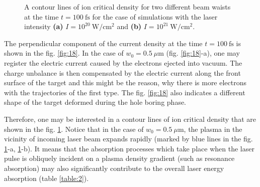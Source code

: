 \begin{figure}[h!]
	\centering
	\hspace{1mm}
	\caption{A contour lines of ion critical density for two different beam waists at the time $ t = 100 \ \mathrm{fs} $ for the case of simulations with the laser intensity \textbf{(a)} $ I = 10^{20} \ \mathrm{W/cm^2} $ and \textbf{(b)} $ I = 10^{21} \ \mathrm{W/cm^2} $.}
	\label{fig:15}
\end{figure}

The perpendicular component of the current density at the time $ t = 100 \ \mathrm{fs} $ is shown in the fig. \ref{fig:18}. In the case of $ w_0 = 0.5 \ \mu\mathrm{m} $ (fig. \ref{fig:18}-a), one may register the electric current caused by the electrons ejected into vacuum. The charge unbalance is then compensated by the electric current along the front surface of the target and this might be the reason, why there is more electrons with the trajectories of the first type. The fig. \ref{fig:18} also indicates a different shape of the target deformed during the hole boring phase.

Therefore, one may be interested in a contour lines of ion critical density that are shown in the fig. \ref{fig:15}. Notice that in the case of $ w_0 = 0.5 \ \mu\mathrm{m} $, the plasma in the vicinity of incoming laser beam expands rapidly (marked by blue lines in the fig. \ref{fig:15}-a, \ref{fig:15}-b). It means that the absorption processes which take place when the laser pulse is obliquely incident on a plasma density gradient (such as resonance absorption) may also significantly contribute to the overall laser energy absorption (table \ref{table:2}).

